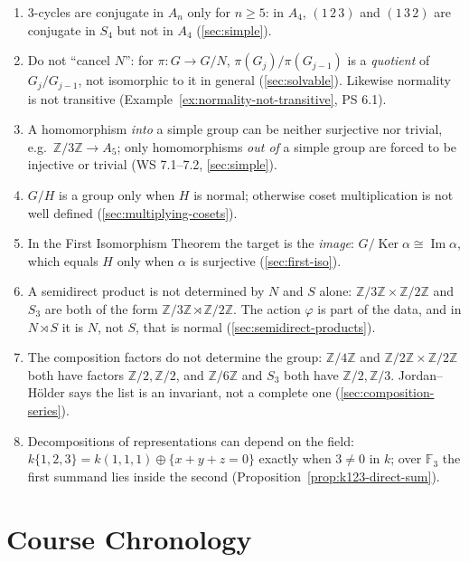 \documentclass[11pt]{report}
\begin{document}
\begin{enumerate}
    \item $3$-cycles are conjugate in $A_n$ only for $n \geq 5$: in $A_4$, $(1\,2\,3)$ and $(1\,3\,2)$ are conjugate in $S_4$ but not in $A_4$ (\ref{sec:simple}).
    \item Do not ``cancel $N$'': for $\pi: G \to G/N$, $\pi(G_j)/\pi(G_{j-1})$ is a \emph{quotient} of $G_j/G_{j-1}$, not isomorphic to it in general (\ref{sec:solvable}). Likewise normality is not transitive (Example~\ref{ex:normality-not-transitive}, PS 6.1).
    \item A homomorphism \emph{into} a simple group can be neither surjective nor trivial, e.g.\ $\mathbb{Z}/3\mathbb{Z} \to A_5$; only homomorphisms \emph{out of} a simple group are forced to be injective or trivial (WS 7.1--7.2, \ref{sec:simple}).
    \item $G/H$ is a group only when $H$ is normal; otherwise coset multiplication is not well defined (\ref{sec:multiplying-cosets}).
    \item In the First Isomorphism Theorem the target is the \emph{image}: $G/\operatorname{Ker}\alpha \cong \operatorname{Im}\alpha$, which equals $H$ only when $\alpha$ is surjective (\ref{sec:first-iso}).
    \item A semidirect product is not determined by $N$ and $S$ alone: $\mathbb{Z}/3\mathbb{Z} \times \mathbb{Z}/2\mathbb{Z}$ and $S_3$ are both of the form $\mathbb{Z}/3\mathbb{Z} \rtimes \mathbb{Z}/2\mathbb{Z}$. The action $\varphi$ is part of the data, and in $N \rtimes S$ it is $N$, not $S$, that is normal (\ref{sec:semidirect-products}).
    \item The composition factors do not determine the group: $\mathbb{Z}/4\mathbb{Z}$ and $\mathbb{Z}/2\mathbb{Z} \times \mathbb{Z}/2\mathbb{Z}$ both have factors $\mathbb{Z}/2, \mathbb{Z}/2$, and $\mathbb{Z}/6\mathbb{Z}$ and $S_3$ both have $\mathbb{Z}/2, \mathbb{Z}/3$. Jordan--H\"older says the list is an invariant, not a complete one (\ref{sec:composition-series}).
    \item Decompositions of representations can depend on the field: $k\{1,2,3\} = k(1,1,1) \oplus \{x + y + z = 0\}$ exactly when $3 \neq 0$ in $k$; over $\mathbb{F}_3$ the first summand lies inside the second (Proposition~\ref{prop:k123-direct-sum}).
\end{enumerate}

\chapter{Course Chronology}\label{ch:chronology}
\end{document}
